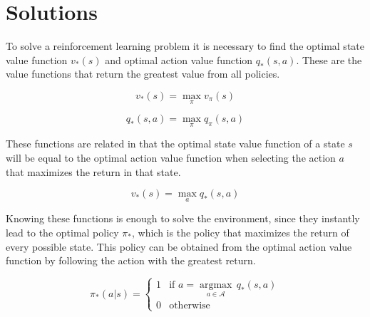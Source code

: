 
\section{Solutions}

To solve a reinforcement learning problem it is necessary to find the optimal state value function $v_\ast(s)$ and optimal action value function $q_\ast(s,a)$. These are the value functions that return the greatest value from all policies.

\begin{equation}
    v_\ast(s) = \max_{\pi}{v_\pi(s)}
\end{equation}

\begin{equation}
    q_\ast(s,a) = \max_{\pi}{q_\pi(s,a)}
\end{equation}

These functions are related in that the optimal state value function of a state $s$ will be equal to the optimal action value function when selecting the action $a$ that maximizes the return in that state.

\begin{equation}
    v_\ast(s) = \max_{a}{q_\ast(s,a)}
\end{equation}

Knowing these functions is enough to solve the environment, since they instantly lead to the optimal policy $\pi_\ast$, which is the policy that maximizes the return of every possible state. This policy can be obtained from the optimal action value function by following the action with the greatest return.

\begin{equation}
    \pi_\ast(a|s) = 
    \begin{cases}
        1 &\textrm{if $a = \underset{a \in \mathcal{A}}{\operatorname{argmax}}$}\,q_\ast(s,a)\\
        0 &\textrm{otherwise}
    \end{cases}
\end{equation}

